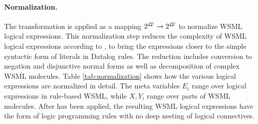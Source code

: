 \paragraph{Normalization.} The transformation \transnorm is
applied as a mapping $2^{\mathcal{L\!E}} \rightarrow 2^{\mathcal{L\!E}}$ to
normalize WSML logical expressions. This normalization step
reduces the complexity of WSML logical expressions according to
\cite[Section 8.2]{wsml-spec}, to bring the expressions closer to
the simple syntactic form of literals in Datalog rules. The
reduction includes conversion to negation and disjunctive normal
forms as well as decomposition of complex WSML molecules. Table
\ref{tab:normalization} shows how the various logical expressions
are normalized in detail. The meta variables $E_i$ range over
logical expressions in rule-based WSML, while $X,Y_i$ range over
parts of WSML molecules. After \transnorm has been applied, the
resulting WSML logical expressions have the form of logic
programming rules with no deep nesting of logical connectives.

